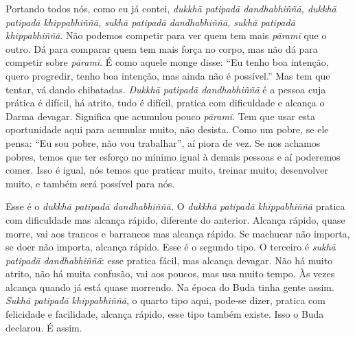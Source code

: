 Portando todos nós, como eu já contei, \textit{dukkhā patipadā
dandhabhiññā, dukkhā patipadā khippabhiññā, sukhā patipadā
dandhabhiññā, sukhā patipadā khippabhiññā}. Não podemos
competir para ver quem tem mais \textit{pāramī} que o outro. Dá
para comparar quem tem mais força no corpo, mas não dá para competir
sobre \textit{pāramī}. É como aquele monge disse: “Eu tenho boa
intenção, quero progredir, tenho boa intenção, mas ainda não é
possível.” Mas tem que tentar, vá dando chibatadas. \textit{Dukkhā
patipadā dandhabhiññā} é a pessoa cuja prática é difícil, há
atrito, tudo é difícil, pratica com dificuldade e alcança o Darma
devagar. Significa que acumulou pouco \textit{pāramī}. Tem que
usar esta oportunidade aqui para acumular muito, não desista. Como um
pobre, se ele pensa: “Eu sou pobre, não vou trabalhar”, aí piora de
vez. Se nos achamos pobres, temos que ter esforço no mínimo igual à
demais pessoas e aí poderemos comer. Isso é igual, nós temos que
praticar muito, treinar muito, desenvolver muito, e também será
possível para nós.

Esse é o \textit{dukkhā patipadā dandhabhiññā. }O
\textit{dukkhā patipadā khippabhiññā} pratica com dificuldade mas
alcança rápido, diferente do anterior. Alcança rápido, quase morre, vai
aos trancos e barrancos mas alcança rápido. Se machucar não importa, se
doer não importa, alcança rápido. Esse é o segundo tipo. O terceiro é
\textit{sukhā patipadā dandhabhiññā}: esse pratica fácil, mas
alcança devagar. Não há muito atrito, não há muita confusão, vai aos
poucos, mas usa muito tempo. Às vezes alcança quando já está quase
morrendo. Na época do Buda tinha gente assim. \textit{Sukhā
patipadā khippabhiññā}, o quarto tipo aqui, pode-se dizer, pratica
com felicidade e facilidade, alcança rápido, esse tipo também existe.
Isso o Buda declarou. É assim.

